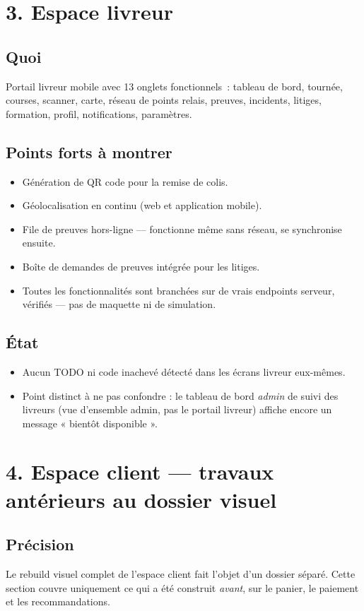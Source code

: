 \documentclass[11pt]{article}
\newcommand{\fait}[1]{\item[\textcolor{okgreen}{\textbf{\checkmark}}] #1}
\newcommand{\reste}[1]{\item[\textcolor{warnred}{\textbf{!}}] #1}
\newcommand{\info}[1]{\item[\textcolor{graytext}{\textbf{i}}] #1}
\begin{document}
\newpage
\section*{3. Espace livreur}

\subsection*{Quoi}
Portail livreur mobile avec 13 onglets fonctionnels~: tableau de bord, tournée, courses, scanner, carte, réseau de points relais, preuves, incidents, litiges, formation, profil, notifications, paramètres.

\subsection*{Points forts à montrer}
\begin{itemize}
\fait{Génération de QR code pour la remise de colis.}
\fait{Géolocalisation en continu (web et application mobile).}
\fait{File de preuves hors-ligne — fonctionne même sans réseau, se synchronise ensuite.}
\fait{Boîte de demandes de preuves intégrée pour les litiges.}
\fait{Toutes les fonctionnalités sont branchées sur de vrais endpoints serveur, vérifiés — pas de maquette ni de simulation.}
\end{itemize}

\subsection*{État}
\begin{itemize}
\info{Aucun TODO ni code inachevé détecté dans les écrans livreur eux-mêmes.}
\reste{Point distinct à ne pas confondre : le tableau de bord \emph{admin} de suivi des livreurs (vue d'ensemble admin, pas le portail livreur) affiche encore un message « bientôt disponible ».}
\end{itemize}

\newpage
\section*{4. Espace client — travaux antérieurs au dossier visuel}

\subsection*{Précision}
Le rebuild visuel complet de l'espace client fait l'objet d'un dossier séparé. Cette section couvre uniquement ce qui a été construit \emph{avant}, sur le panier, le paiement et les recommandations.
\end{document}
